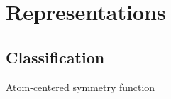 
\section{Representations}
\subsection{Classification}
% 




% 
% 
\begin{frame}{Atom-centered symmetry function}

\end{frame}

